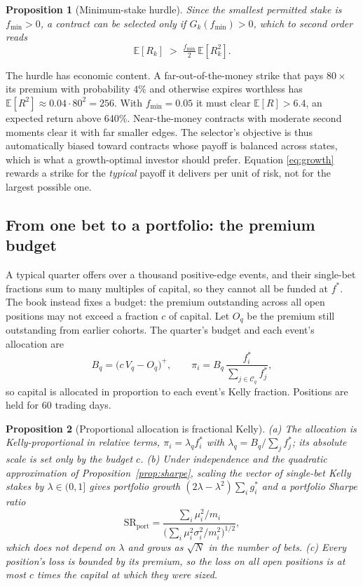 \documentclass[11pt]{article}
\newtheorem{proposition}{Proposition}
\theoremstyle{definition}
\newcommand{\E}{\mathbb{E}}
\newcommand{\1}{\mathbf{1}}
\begin{document}
\begin{proposition}[Minimum-stake hurdle]\label{prop:hurdle}
Since the smallest permitted stake is $f_{\min}>0$, a contract can be selected only if
$G_k(f_{\min})>0$, which to second order reads
\begin{equation}
  \E[R_k]\;>\;\tfrac{f_{\min}}{2}\,\E[R_k^2].
  \label{eq:hurdle}
\end{equation}
\end{proposition}

The hurdle has economic content. A far-out-of-the-money strike that pays $80\times$ its
premium with probability $4\%$ and otherwise expires worthless has $\E[R^2]\approx0.04\cdot80^2=256$.
With $f_{\min}=0.05$ it must clear $\E[R]>6.4$, an expected return above 640\%. Near-the-money
contracts with moderate second moments clear it with far smaller edges. The selector's
objective is thus automatically biased toward contracts whose payoff is balanced across
states, which is what a growth-optimal investor should prefer. Equation \eqref{eq:growth}
rewards a strike for the \emph{typical} payoff it delivers per unit of risk, not for the
largest possible one.

\subsection{From one bet to a portfolio: the premium budget}

A typical quarter offers over a thousand positive-edge events, and their single-bet fractions
sum to many multiples of capital, so they cannot all be funded at $f^\ast$. The book instead
fixes a budget: the premium outstanding across all open positions may not exceed a fraction
$c$ of capital. Let $O_q$ be the premium still outstanding from earlier cohorts. The
quarter's budget and each event's allocation are
\begin{equation}
  B_q=\big(c\,V_q-O_q\big)^+,\qquad
  \pi_i=B_q\,\frac{f^\ast_{i}}{\sum_{j\in\mathcal C_q}f^\ast_{j}},
  \label{eq:alloc}
\end{equation}
so capital is allocated in proportion to each event's Kelly fraction. Positions are held for
60 trading days.

\begin{proposition}[Proportional allocation is fractional Kelly]\label{prop:fractional}
(a) The allocation is Kelly-proportional in relative terms, $\pi_i=\lambda_q f^\ast_i$ with
$\lambda_q=B_q/\sum_jf^\ast_j$; its absolute scale is set only by the budget $c$.
(b) Under independence and the quadratic approximation of Proposition~\ref{prop:sharpe},
scaling the vector of single-bet Kelly stakes by $\lambda\in(0,1]$ gives portfolio growth
$(2\lambda-\lambda^2)\sum_ig^\ast_i$ and a portfolio Sharpe ratio
\begin{equation}
  \mathrm{SR}_{\text{port}}=\frac{\sum_i\mu_i^2/m_i}{\big(\sum_i\mu_i^2\sigma_i^2/m_i^2\big)^{1/2}},
\end{equation}
which does not depend on $\lambda$ and grows as $\sqrt N$ in the number of bets.
(c) Every position's loss is bounded by its premium, so the loss on all open positions is
at most $c$ times the capital at which they were sized.
\end{proposition}
\end{document}
